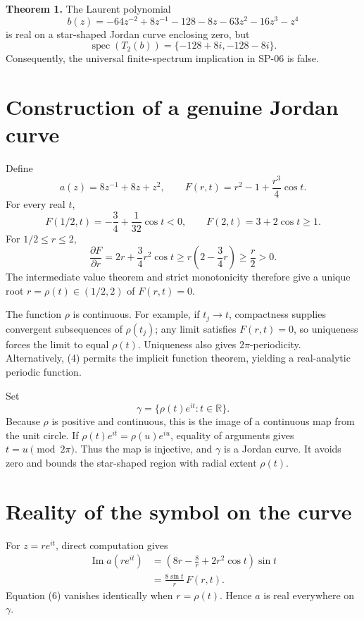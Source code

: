 \documentclass[10pt,a4paper]{article}
\begin{document}
\textbf{Theorem 1.} The Laurent polynomial \[
 b(z)=-64z^{-2}+8z^{-1}-128-8z-63z^2-16z^3-z^4
 \tag{1}
\] is real on a star-shaped Jordan curve enclosing zero, but \[
 \operatorname{spec}(T_2(b))=\{-128+8i,-128-8i\}.
 \tag{2}
\] Consequently, the universal finite-spectrum implication in SP-06 is
false.

\section{Construction of a genuine Jordan
curve}\label{construction-of-a-genuine-jordan-curve}

Define \[
 a(z)=8z^{-1}+8z+z^2,
 \qquad F(r,t)=r^2-1+\frac{r^3}{4}\cos t.
 \tag{3}
\] For every real \(t\), \[
 F(1/2,t)=-\frac34+\frac1{32}\cos t<0,
 \qquad F(2,t)=3+2\cos t\ge1.
\] For \(1/2\le r\le2\), \[
 \frac{\partial F}{\partial r}
 =2r+\frac34r^2\cos t
 \ge r\left(2-\frac34r\right)\ge\frac r2>0.
 \tag{4}
\] The intermediate value theorem and strict monotonicity therefore give
a unique root \(r=\rho(t)\in(1/2,2)\) of \(F(r,t)=0\).

The function \(\rho\) is continuous. For example, if \(t_j\to t\),
compactness supplies convergent subsequences of \(\rho(t_j)\); any limit
satisfies \(F(r,t)=0\), so uniqueness forces the limit to equal
\(\rho(t)\). Uniqueness also gives \(2\pi\)-periodicity. Alternatively,
(4) permits the implicit function theorem, yielding a real-analytic
periodic function.

Set \[
 \gamma=\{\rho(t)e^{it}:t\in\mathbb R\}.
 \tag{5}
\] Because \(\rho\) is positive and continuous, this is the image of a
continuous map from the unit circle. If \(\rho(t)e^{it}=\rho(u)e^{iu}\),
equality of arguments gives \(t=u\pmod{2\pi}\). Thus the map is
injective, and \(\gamma\) is a Jordan curve. It avoids zero and bounds
the star-shaped region with radial extent \(\rho(t)\).

\section{Reality of the symbol on the
curve}\label{reality-of-the-symbol-on-the-curve}

For \(z=re^{it}\), direct computation gives \[
 \begin{aligned}
 \operatorname{Im}a(re^{it})
 &=\left(8r-\frac8r+2r^2\cos t\right)\sin t\\
 &=\frac{8\sin t}{r}\,F(r,t).
 \end{aligned}
 \tag{6}
\] Equation (6) vanishes identically when \(r=\rho(t)\). Hence \(a\) is
real everywhere on \(\gamma\).
\end{document}
